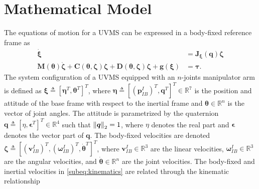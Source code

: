 \documentclass[../main.tex]{subfiles}
\begin{document}


\section{Mathematical Model}\label{sec:background}
The equations of motion for a UVMS can be expressed in a body-fixed reference frame as \citep{From2014}
\begin{subequations}
\label{eq:vms_motion_eqs}
\begin{align}
    \label{subeq:kinematics}
    \dot{\bm{\xi}} &= \bm{J}_{\bm{\xi}}(\bm{q}) \bm{\zeta} \\
    \label{subeq:dynamics}
        \bm{M}(\bm{\theta})\dot{\bm{\zeta}}
        + \bm{C}(\bm{\theta}, \bm{\zeta})\bm{\zeta}
        + \bm{D}(\bm{\theta}, \bm{\zeta})\bm{\zeta}
        + \bm{g}(\bm{\xi})
        &= \bm{\tau}.
    \end{align}
\end{subequations}
The system configuration of a UVMS equipped with an $n$-joints manipulator arm is defined as $\bm{\xi} \triangleq \left[\bm{\eta}^T, \bm{\theta}^T\right]^T$, where $\bm{\eta} \triangleq \left[ (\bm{p}^I_{IB})^T, \bm{q}^T \right]^T \in \mathbb{R}^7$ is the position and attitude of the base frame with respect to the inertial frame and $\bm{\theta} \in \mathbb{R}^n$ is the vector of joint angles. The attitude is parametrized by the quaternion $\bm{q} \triangleq \left[\eta,\bm{\epsilon}^T\right]^T \in \mathbb{R}^4$ such that $\left\lVert\bm{q}\right\rVert_2 = 1$, where $\eta$ denotes the real part and $\bm{\epsilon}$ denotes the vector part of $\bm{q}$. The body-fixed velocities are denoted $\bm{\zeta} \triangleq
\left[
    (\boldsymbol{v}_{IB}^I)^T,
    (\boldsymbol{\omega}_{IB}^I)^T,
    \dot{\boldsymbol{\theta}}^T
\right]^T$, where $\bm{v}_{IB}^I \in \mathbb{R}^3$ are the linear velocities,
$\bm{\omega}_{IB}^I \in \mathbb{R}^3$ are the angular velocities,
and $\dot{\bm{\theta}} \in \mathbb{R}^n$
are the joint velocities. The body-fixed and inertial velocities in \eqref{subeq:kinematics} are related through the kinematic relationship
\end{document}
